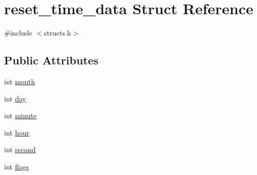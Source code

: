 \hypertarget{structreset__time__data}{\section{reset\-\_\-time\-\_\-data Struct Reference}
\label{structreset__time__data}
}


{\ttfamily \#include $<$structs.\-h$>$}

\subsection*{Public Attributes}
\begin{DoxyCompactItemize}
\item 
int \hyperlink{structreset__time__data_ab320b6195efd25d466a2e9bc295f305e}{month}
\item 
int \hyperlink{structreset__time__data_a6efbbdbd811a8d6c678a51beac313a94}{day}
\item 
int \hyperlink{structreset__time__data_afa7cb8034b959b3b234125a81a7eaee7}{minute}
\item 
int \hyperlink{structreset__time__data_a62ede3dfbfbdc66afcb90471974a9bc5}{hour}
\item 
int \hyperlink{structreset__time__data_aae7671c11352b020ff22a146fc209c3b}{second}
\item 
int \hyperlink{structreset__time__data_abdeb58a107e8bb7674f5d879027f71b9}{flags}
\end{DoxyCompactItemize}


